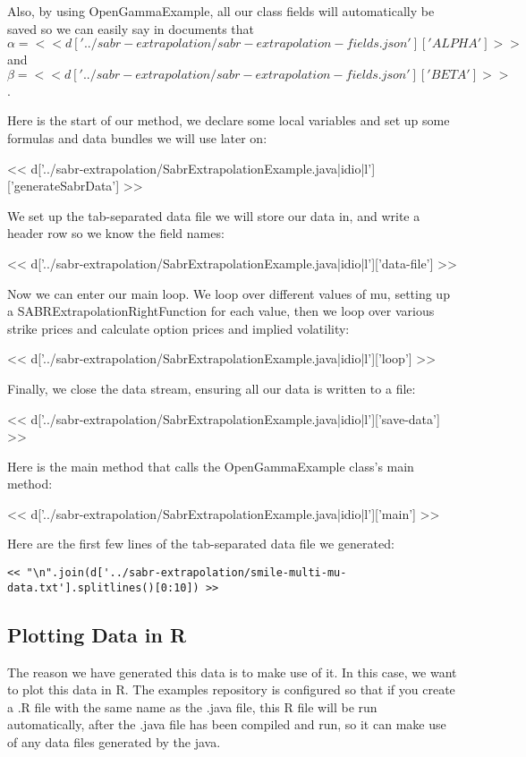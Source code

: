 Also, by using OpenGammaExample, all our class fields will automatically be
saved so we can easily say in documents that
$\alpha=<< d['../sabr-extrapolation/sabr-extrapolation-fields.json']['ALPHA'] >>$ and
$\beta=<< d['../sabr-extrapolation/sabr-extrapolation-fields.json']['BETA'] >>$.

Here is the start of our method, we declare some local variables and set up
some formulas and data bundles we will use later on:

<< d['../sabr-extrapolation/SabrExtrapolationExample.java|idio|l']['generateSabrData'] >>

We set up the tab-separated data file we will store our data in, and write a
header row so we know the field names:

<< d['../sabr-extrapolation/SabrExtrapolationExample.java|idio|l']['data-file'] >>

Now we can enter our main loop. We loop over different values of mu, setting up
a SABRExtrapolationRightFunction for each value, then we loop over various
strike prices and calculate option prices and implied volatility:

<< d['../sabr-extrapolation/SabrExtrapolationExample.java|idio|l']['loop'] >>

Finally, we close the data stream, ensuring all our data is written to a file:

<< d['../sabr-extrapolation/SabrExtrapolationExample.java|idio|l']['save-data'] >>

Here is the main method that calls the OpenGammaExample class's main method:

<< d['../sabr-extrapolation/SabrExtrapolationExample.java|idio|l']['main'] >>

Here are the first few lines of the tab-separated data file we generated:

\begin{Verbatim}
<< "\n".join(d['../sabr-extrapolation/smile-multi-mu-data.txt'].splitlines()[0:10]) >>
\end{Verbatim}

\subsection{Plotting Data in R}

The reason we have generated this data is to make use of it. In this case, we
want to plot this data in R. The examples repository is configured so that if
you create a .R file with the same name as the .java file, this R file will
be run automatically, after the .java file has been compiled and run, so it can
make use of any data files generated by the java.

